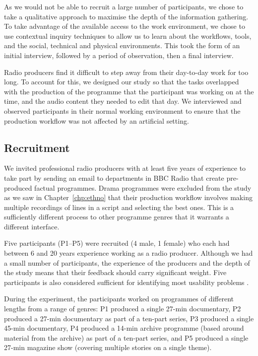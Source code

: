 As we would not be able to recruit a large number of participants, we chose to take a qualitative approach to maximise
the depth of the information gathering. To take advantage of the available access to the work environment, we chose to
use contextual inquiry techniques to allow us to learn about the workflows, tools, and the social, technical and
physical environments. This took the form of an initial interview, followed by a period of observation, then a final
interview.

Radio producers find it difficult to step away from their day-to-day work for too long.  To account for this, we
designed our study so that the tasks overlapped with
the production of the programme that the participant was working on at the time, and the audio
content they needed to edit that day. We interviewed and observed participants in their normal working environment to
ensure that the production workflow was not affected by an artificial setting.

\subsection{Recruitment}

We invited professional radio producers with at least five years of experience to take part by sending an email to
departments in BBC Radio that create pre-produced factual programmes.  Drama programmes were excluded from the study as
we saw in Chapter~\ref{chp:ethno} that their production workflow involves making multiple recordings of lines in a
script and selecting the best ones. This is a sufficiently different process to other programme genres that it warrants
a different interface.

Five participants (P1--P5) were recruited (4 male, 1 female) who each had between 6 and 20 years experience working
as a radio producer. Although we had a small number of participants, the experience of the producers and the depth of
the study means that their feedback should carry significant weight. Five participants is also considered sufficient
for identifying most usability problems \citep{Nielsen1993}.

During the experiment, the participants worked on programmes of different
lengths from a range of genres:
P1 produced a single 27-min documentary, %
P2 produced a 27-min documentary as part of a ten-part series,
P3 produced a single 45-min documentary,
P4 produced a 14-min archive programme
(based around material from the archive) as part of a ten-part series, and
P5 produced a single 27-min magazine show (covering multiple stories on a
single theme).

